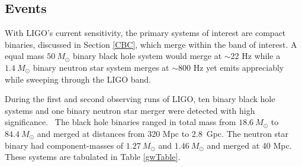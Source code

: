 \documentclass [12pt, proquest]{uwthesis}[2019]
\begin{document}
\subsection{Events}

With LIGO's current sensitivity, the primary systems of interest are compact binaries, discussed in Section \ref{CBC}, which merge within the band of interest. A equal mass $50\ M_\odot$ binary black hole system would merge at $\sim$22 Hz while a $1.4\ M_\odot$ binary neutron star system merges at $\sim$800 Hz yet emits appreciably while sweeping through the LIGO band.

During the first and second observing runs of LIGO, ten binary black hole systems and one binary neutron star merger were detected with high significance.~\cite{GWTC} The black hole binaries ranged in total mass from $18.6\ M_\odot$ to $84.4\ M_\odot$ and merged at distances from 320 Mpc to 2.8~Gpc. The neutron star binary had component-masses of $1.27\ M_\odot$ and $1.46\ M_\odot$ and merged at 40 Mpc. These systems are tabulated in Table \ref{gwTable}.
\end{document}
